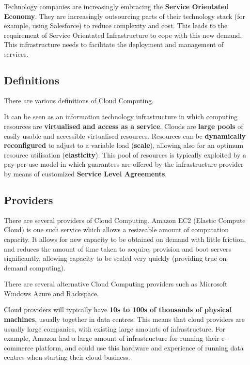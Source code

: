 \documentclass{article}
\begin{document}
Technology companies are increasingly embracing the \textbf{Service Orientated Economy}. They are increasingly outsourcing parts of their technology stack (for example, using Salesforce) to reduce complexity and cost. This leads to the requirement of Service Orientated Infrastructure to cope with this new demand. This infrastructure needs to facilitate the deployment and management of services.

\subsection{Definitions}

There are various definitions of Cloud Computing.

It can be seen as an information technology infrastructure in which computing resources are \textbf{virtualised and access as a service}. Clouds are \textbf{large pools} of easily usable and accessible virtualised resources. Resources can be \textbf{dynamically reconfigured} to adjust to a variable load (\textbf{scale}), allowing also for an optimum resource utilisation (\textbf{elasticity}). This pool of resources is typically exploited by a pay-per-use model in which guarantees are offered by the infrastructure provider by means of customized \textbf{Service Level Agreements}.

\subsection{Providers}

There are several providers of Cloud Computing. Amazon EC2 (Elastic Compute Cloud) is one such service which allows a resizeable amount of computation capacity. It allows for new capacity to be obtained on demand with little friction, and reduces the amount of time taken to acquire, provision and boot servers significantly, allowing capacity to be scaled very quickly (providing true on-demand computing). 

There are several alternative Cloud Computing providers such as Microsoft Windows Azure and Rackspace. 

Cloud providers will typically have \textbf{10s to 100s of thousands of physical machines}, usually together in data centres. This means that cloud providers are usually large companies, with existing large amounts of infrastructure. For example, Amazon had a large amount of infrastructure for running their e-commerce platform, and could use this hardware and experience of running data centres when starting their cloud business.
\end{document}
